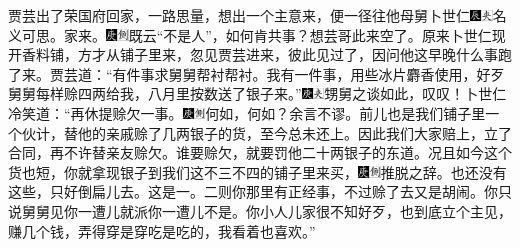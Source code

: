 贾芸出了荣国府回家，一路思量，想出一个主意来，便一径往他母舅卜世仁{\includegraphics[width=3mm]{../Images/00009}\includegraphics[width=3mm]{../Images/00012}\footnotesize \kaishu 名义可思。}家来。{\includegraphics[width=3mm]{../Images/00004}\includegraphics[width=3mm]{../Images/00011}\footnotesize \kaishu 既云``不是人''，如何肯共事？想芸哥此来空了。}原来卜世仁现开香料铺，方才从铺子里来，忽见贾芸进来，彼此见过了，因问他这早晚什么事跑了来。贾芸道：``有件事求舅舅帮衬帮衬。我有一件事，用些冰片麝香使用，好歹舅舅每样赊四两给我，八月里按数送了银子来。''{\includegraphics[width=3mm]{../Images/00004}\includegraphics[width=3mm]{../Images/00012}\footnotesize \kaishu 甥舅之谈如此，叹叹！}卜世仁冷笑道：``再休提赊欠一事。{\includegraphics[width=3mm]{../Images/00004}\includegraphics[width=3mm]{../Images/00011}\footnotesize \kaishu 何如，何如？余言不谬。}前儿也是我们铺子里一个伙计，替他的亲戚赊了几两银子的货，至今总未还上。因此我们大家赔上，立了合同，再不许替亲友赊欠。谁要赊欠，就要罚他二十两银子的东道。况且如今这个货也短，你就拿现银子到我们这不三不四的铺子里来买，{\includegraphics[width=3mm]{../Images/00004}\includegraphics[width=3mm]{../Images/00011}\footnotesize \kaishu 推脱之辞。}也还没有这些，只好倒扁儿去。这是一。二则你那里有正经事，不过赊了去又是胡闹。你只说舅舅见你一遭儿就派你一遭儿不是。你小人儿家很不知好歹，也到底立个主见，赚几个钱，弄得穿是穿吃是吃的，我看着也喜欢。''

